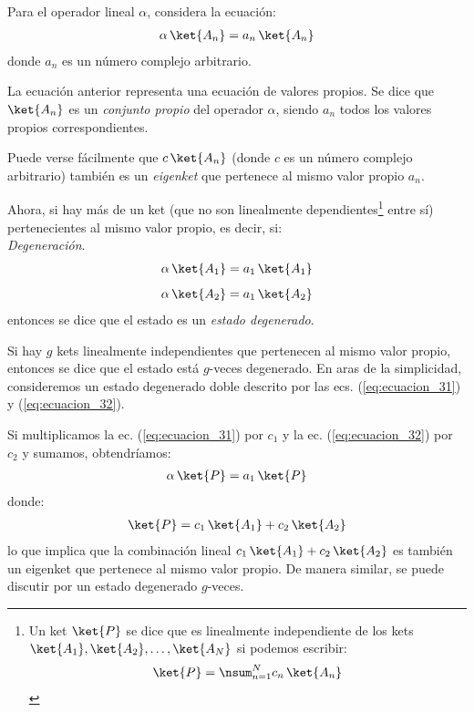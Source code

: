 Para el operador lineal $\alpha$, considera la ecuación:
\begin{align}
\alpha \, \ket{A_{n}} = a_{n} \, \ket{A_{n}}
\label{eq:ecuacion_30}
\end{align}
donde $a_{n}$ es un número complejo arbitrario.
\par
La ecuación anterior representa una ecuación de valores propios. Se dice que $\ket{A_{n}}$ es un \emph{conjunto propio} del operador $\alpha$, siendo $a_{n}$ todos los valores propios correspondientes.
\par
Puede verse fácilmente que $c \, \ket{A_{n}}$ (donde $c$ es un número complejo arbitrario) también es un \emph{eigenket} que pertenece al mismo valor propio $a_{n}$.
\par
Ahora, si hay más de un ket (que no son linealmente dependientes\footnote{Un ket $\ket{P}$ se dice que es linealmente independiente de los kets $\ket{A_{1}}, \ket{A_{2}}, \ldots, \ket{A_{N}}$ si podemos escribir:
\begin{align*}
\ket{P} = \nsum_{n=1}^{N} c_{n} \, \ket{A_{n}}
\end{align*}} entre sí) pertenecientes al mismo valor propio, es decir, si:
\\[0.5em]
\emph{Degeneración}.
\begin{align}
\alpha \, \ket{A_{1}} &= a_{1} \, \ket{A_{1}} \label{eq:ecuacion_31} \\[0.5em]
\alpha \, \ket{A_{2}} &= a_{1} \, \ket{A_{2}} \label{eq:ecuacion_32}
\end{align}
entonces se dice que el estado es un \emph{estado degenerado}.
\par
Si hay $g$ kets linealmente independientes que pertenecen al mismo valor propio, entonces se dice que el estado está $g$-veces degenerado. En aras de la simplicidad, consideremos un estado degenerado doble descrito por las ecs. (\ref{eq:ecuacion_31}) y (\ref{eq:ecuacion_32}).
\par
Si multiplicamos la ec. (\ref{eq:ecuacion_31}) por $c_{1}$ y la ec. (\ref{eq:ecuacion_32}) por $c_{2}$ y sumamos, obtendríamos:
\begin{align*}
\alpha \, \ket{P} = a_{1} \, \ket{P}
\end{align*}
donde:
\begin{align*}
\ket{P} = c_{1} \, \ket{A_{1}} + c_{2} \, \ket{A_{2}}
\end{align*}
lo que implica que la combinación lineal $c_{1} \, \ket{A_{1}} + c_{2} \, \ket{A_{2}}$ es también un eigenket que pertenece al mismo valor propio. De manera similar, se puede discutir por un estado degenerado $g$-veces.

